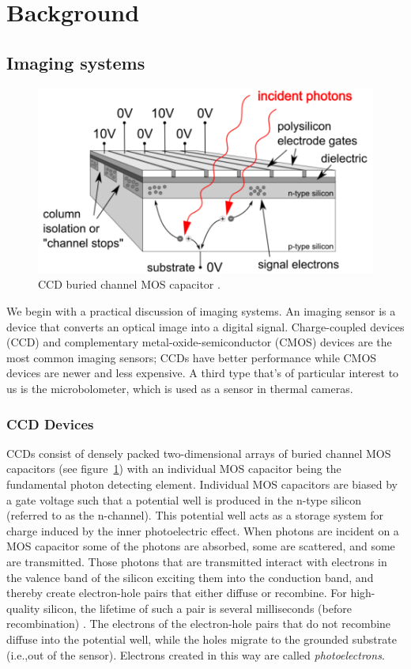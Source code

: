 \section{Background}\label{sec:background}
\localtableofcontents
\subsection{Imaging systems}\label{subsec:imaging-systems}
\begin{figure}[!htbp]
	\includegraphics[width=\linewidth,keepaspectratio]{figures/background/bccd.png}
	\caption{CCD buried channel MOS capacitor \cite{finaltestguideline}.}
	\label{fig:mos-cap}
\end{figure}
We begin with a practical discussion of imaging systems.
%
An imaging sensor is a device that converts an optical image into a digital signal.
%
Charge-coupled devices (CCD) and complementary metal-oxide-semiconductor (CMOS) devices are the most common imaging sensors;
%
CCDs have better performance while CMOS devices are newer and less expensive.
%
A third type that's of particular interest to us is the microbolometer, which is used as a sensor in thermal cameras.
\subsubsection{CCD Devices}
CCDs consist of densely packed two-dimensional arrays of buried channel MOS capacitors (see figure~\ref{fig:mos-cap}) with an individual MOS capacitor being the fundamental photon detecting element.
%
Individual MOS capacitors are biased by a gate voltage such that a potential well is produced in the n-type silicon (referred to as the n-channel).
%
This potential well acts as a storage system for charge induced by the inner photoelectric effect.
%
When photons are incident on a MOS capacitor some of the photons are absorbed, some are scattered, and some are transmitted.
%
Those photons that are transmitted interact with electrons in the valence band of the silicon exciting them into the conduction band, and thereby create electron-hole pairs that either diffuse or recombine.
%
For high-quality silicon, the lifetime of such a pair is several milliseconds (before recombination) \cite{scientificccd}.
%
The electrons of the electron-hole pairs that do not recombine diffuse into the potential well, while the holes migrate to the grounded substrate (i.e.,out of the sensor).
%
Electrons created in this way are called \textit{photoelectrons}.

